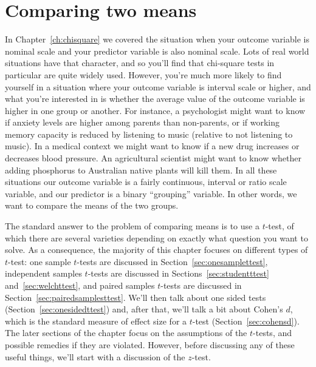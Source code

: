 

\chapter{Comparing two means \label{ch:ttest}}

In Chapter~\ref{ch:chisquare} we covered the situation when your outcome variable is nominal scale and your predictor variable is also nominal scale. Lots of real world situations have that character, and so you'll find that chi-square tests in particular are quite widely used. However, you're much more likely to find yourself in a situation where your outcome variable is interval scale or higher, and what you're interested in is whether the average value of the outcome variable is higher in one group or another. For instance, a psychologist might want to know if anxiety levels are higher among parents than non-parents, or if working memory capacity is reduced by listening to music (relative to not listening to music). In a medical context we might want to know if a new drug increases or decreases blood pressure. An agricultural scientist might want to know whether adding phosphorus to Australian native plants will kill them. In all these situations our outcome variable is a fairly continuous, interval or ratio scale variable, and our predictor is a binary ``grouping'' variable. In other words, we want to compare the means of the two groups. 

The standard answer to the problem of comparing means is to use a $t$-test, of which there are several varieties depending on exactly what question you want to solve. As a consequence, the majority of this chapter focuses on different types of $t$-test: one sample $t$-tests are discussed in Section~\ref{sec:onesamplettest}, independent samples $t$-tests are discussed in Sections~\ref{sec:studentttest} and~\ref{sec:welchttest}, and paired samples $t$-tests are discussed in Section~\ref{sec:pairedsamplesttest}. We'll then talk about one sided tests (Section~\ref{sec:onesidedttest}) and, after that, we'll talk a bit about Cohen's $d$, which is the standard measure of effect size for a $t$-test (Section~\ref{sec:cohensd}). The later sections of the chapter focus on the assumptions of the $t$-tests, and possible remedies if they are violated. However, before discussing any of these useful things, we'll start with a discussion of the $z$-test. 


